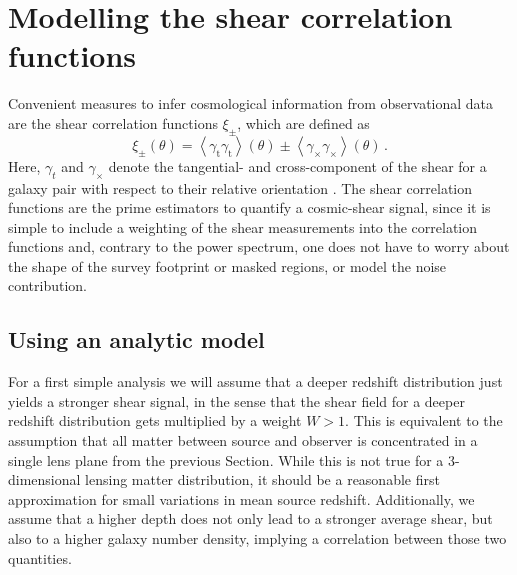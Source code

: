 \documentclass[referee]{aa} %
\renewcommand{\[}{\begin{equation}}
\renewcommand{\]}{\end{equation}}
\renewcommand{\rm}{\mathrm}
\def\la{\left<}
\def\ra{\right>}
\begin{document}

\section{Modelling the shear correlation functions}
\label{sec:xipm}
Convenient measures to infer cosmological information from observational data are the shear correlation functions $\xi_\pm$, which are defined as \[
\xi_\pm(\theta) = \la \gamma_{\rm t}\gamma_{\rm t}\ra(\theta) \pm \la \gamma_\times\gamma_\times\ra(\theta) \, .
\]
Here, $\gamma_t$ and $\gamma_\times$ denote the tangential- and cross-component of the shear for a galaxy pair with respect to their relative orientation \citep[see][]{2002A&A...396....1S}.
The shear correlation functions are the prime estimators to quantify a cosmic-shear signal, since it is simple to include a weighting of the shear measurements into the correlation functions and, contrary to the power spectrum, one does not have to worry about the shape of the survey footprint or masked regions, or model the noise contribution. 
\subsection{Using an analytic model}
\label{sec:xipm_analytic}
For a first simple analysis we will assume that a deeper redshift distribution just yields a stronger shear signal, in the sense that the shear field for a deeper redshift distribution gets multiplied by a weight $W>1$. This is equivalent to the assumption that all matter between source and observer is concentrated in a single lens plane from the previous Section. While this is not true for a 3-dimensional lensing matter distribution, it should be a reasonable first approximation for small variations in mean source redshift. Additionally, we assume that a higher depth does not only lead to a stronger average shear, but also to a higher galaxy number density, implying a correlation between those two quantities.
\end{document}
